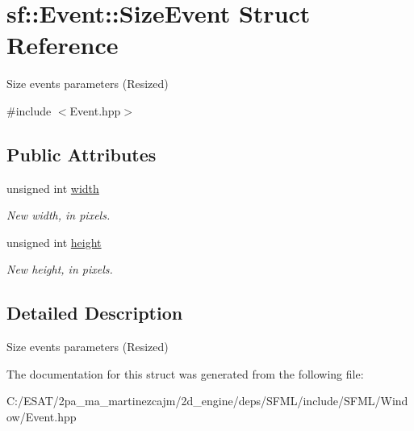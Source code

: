 \hypertarget{structsf_1_1_event_1_1_size_event}{}\section{sf\+:\+:Event\+:\+:Size\+Event Struct Reference}
\label{structsf_1_1_event_1_1_size_event}


Size events parameters (Resized)  




{\ttfamily \#include $<$Event.\+hpp$>$}

\subsection*{Public Attributes}
\begin{DoxyCompactItemize}
\item 
\mbox{\label{structsf_1_1_event_1_1_size_event_a20ea1b78c9bb1604432f8f0067bbfd94}} 
unsigned int \hyperlink{structsf_1_1_event_1_1_size_event_a20ea1b78c9bb1604432f8f0067bbfd94}{width}
\begin{DoxyCompactList}\small\item\em New width, in pixels. \end{DoxyCompactList}\item 
\mbox{\label{structsf_1_1_event_1_1_size_event_af0f76a599d5f48189cb8d78d4e5facdb}} 
unsigned int \hyperlink{structsf_1_1_event_1_1_size_event_af0f76a599d5f48189cb8d78d4e5facdb}{height}
\begin{DoxyCompactList}\small\item\em New height, in pixels. \end{DoxyCompactList}\end{DoxyCompactItemize}


\subsection{Detailed Description}
Size events parameters (Resized) 

The documentation for this struct was generated from the following file\+:\begin{DoxyCompactItemize}
\item 
C\+:/\+E\+S\+A\+T/2pa\+\_\+ma\+\_\+martinezcajm/2d\+\_\+engine/deps/\+S\+F\+M\+L/include/\+S\+F\+M\+L/\+Window/Event.\+hpp\end{DoxyCompactItemize}
